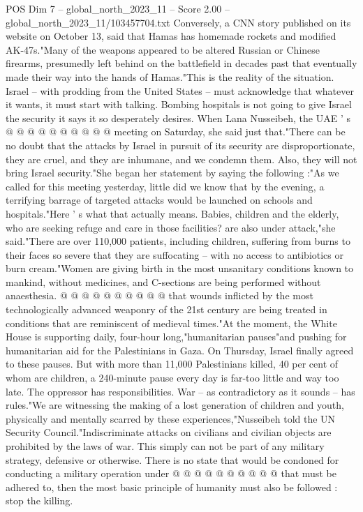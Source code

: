 \begin{textsample}{POS Dim 7 – global\_north\_2023\_11 – Score 2.00 – global\_north\_2023\_11/103457704.txt}
Conversely, a CNN story published on its website on October 13, said that Hamas has homemade rockets and modified AK-47s."Many of the weapons appeared to be altered Russian or Chinese firearms, presumedly left behind on the battlefield in decades past that eventually made their way into the hands of Hamas."This is the reality of the situation.
Israel -- with prodding from the United States -- must acknowledge that whatever it wants, it must start with talking.
Bombing hospitals is not going to give Israel the security it says it so desperately desires.
When Lana Nusseibeh, the UAE ' s @ @ @ @ @ @ @ @ @ @ meeting on Saturday, she said just that."There can be no doubt that the attacks by Israel in pursuit of its security are disproportionate, they are cruel, and they are inhumane, and we condemn them.
Also, they will not bring Israel security."She began her statement by saying the following :"As we called for this meeting yesterday, little did we know that by the evening, a terrifying barrage of targeted attacks would be launched on schools and hospitals."Here ' s what that actually means.
Babies, children and the elderly, who are seeking refuge and care in those facilities? are also under attack,"she said."There are over 110,000 patients, including children, suffering from burns to their faces so severe that they are suffocating -- with no access to antibiotics or burn cream."Women are giving birth in the most unsanitary conditions known to mankind, without medicines, and C-sections are being performed without anaesthesia. @ @ @ @ @ @ @ @ @ @ that wounds inflicted by the most technologically advanced weaponry of the 21st century are being treated in conditions that are reminiscent of medieval times."At the moment, the White House is supporting daily, four-hour long,"humanitarian pauses"and pushing for humanitarian aid for the Palestinians in Gaza.
On Thursday, Israel finally agreed to these pauses.
But with more than 11,000 Palestinians killed, 40 per cent of whom are children, a 240-minute pause every day is far-too little and way too late.
The oppressor has responsibilities.
War -- as contradictory as it sounds -- has rules."We are witnessing the making of a lost generation of children and youth, physically and mentally scarred by these experiences,"Nusseibeh told the UN Security Council."Indiscriminate attacks on civilians and civilian objects are prohibited by the laws of war.
This simply can not be part of any military strategy, defensive or otherwise.
There is no state that would be condoned for conducting a military operation under @ @ @ @ @ @ @ @ @ @ that must be adhered to, then the most basic principle of humanity must also be followed : stop the killing.

\end{textsample}
